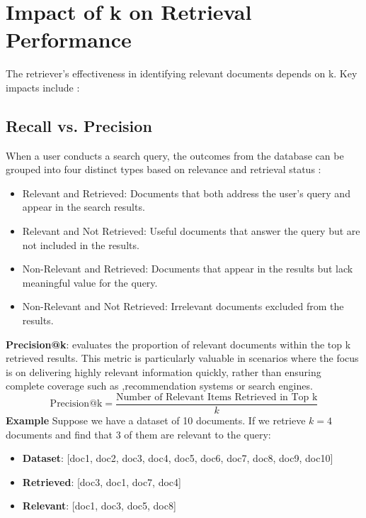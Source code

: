 \section{Impact of k on Retrieval Performance}
The retriever's effectiveness in identifying relevant documents depends on k. Key impacts include :
\subsection{Recall vs. Precision} 
When a user conducts a search query, the outcomes from the database can be grouped into four distinct types based on relevance and retrieval status \citep{geeksforgeeks2022precision}:
\begin{itemize}
	\item {Relevant and Retrieved:} Documents that both address the user’s query and appear in the search results.
	\item {Relevant and Not Retrieved:} Useful documents that answer the query but are not included in the results.
	
	\item {Non-Relevant and Retrieved:} Documents that appear in the results but lack meaningful value for the query.
	 
	\item {Non-Relevant and Not Retrieved:} Irrelevant documents excluded from the results.
\end{itemize}


\textbf{Precision@k}: evaluates the proportion of relevant documents within the top k retrieved results. This metric is particularly valuable in scenarios where the focus is on delivering highly relevant information quickly, rather than ensuring complete coverage such as ,recommendation systems or search engines\citep{deconvoluteai2024metrics}.
\begin{equation}
\text{Precision@k} = \frac{\text{Number of Relevant Items Retrieved in Top k}}{k}
\end{equation}
\textbf{Example}
Suppose we have a dataset of 10 documents. If we retrieve \( k = 4 \) documents and find that 3 of them are relevant to the query:

\begin{itemize}
	\item \textbf{Dataset}: [doc1, doc2, doc3, doc4, doc5, doc6, doc7, doc8, doc9, doc10]
	\item \textbf{Retrieved}: [doc3, doc1, doc7, doc4]
	\item \textbf{Relevant}: [doc1, doc3, doc5, doc8]
\end{itemize}

